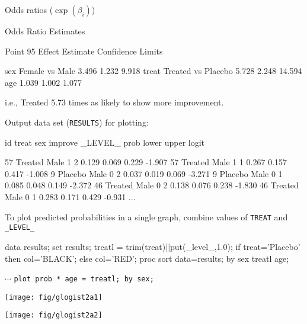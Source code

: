 \begin{frame}[fragile]
Odds ratios ($\exp(\beta_i)$)
\begin{Output}[gobble=5,fontsize=\footnotesize,baselinestretch=0.9]
                              Odds Ratio Estimates
                                        
                                         Point          95%
          Effect                      Estimate      Confidence Limits

          sex   Female vs Male           3.496       1.232       9.918
          treat Treated vs Placebo       5.728       2.248      14.594
          age                            1.039       1.002       1.077
\end{Output}
i.e., Treated 5.73 times as likely to show more improvement.
\vspace{1.5ex}

Output data set (\texttt{RESULTS}) for plotting:
\begin{Output}[gobble=2,fontsize=\footnotesize,baselinestretch=0.9]
  id    treat    sex  improve  _LEVEL_   prob   lower   upper   logit

  57   Treated   Male     1       2      0.129   0.069   0.229  -1.907
  57   Treated   Male     1       1      0.267   0.157   0.417  -1.008
   9   Placebo   Male     0       2      0.037   0.019   0.069  -3.271
   9   Placebo   Male     0       1      0.085   0.048   0.149  -2.372
  46   Treated   Male     0       2      0.138   0.076   0.238  -1.830
  46   Treated   Male     0       1      0.283   0.171   0.429  -0.931
  ...
\end{Output}
\end{frame}

\begin{frame}[fragile]
To plot predicted probabilities in a single graph, combine values of \texttt{TREAT} and
\verb|_LEVEL_|
\begin{Input}[fontsize=\small,label=\fbox{$\cdots$ \texttt{glogist2a.sas} $\cdots$},baselinestretch=0.8,firstnumber=13]
data results;
   set results;
   treatl = trim(treat)||put(_level_,1.0); 
   if treat='Placebo' then col='BLACK';
                      else col='RED';
proc sort data=results;
   by sex treatl age;
\end{Input}
$\cdots$ \texttt{plot prob * age = treatl; by sex;}
\begin{center}
 \begin{minipage}[b]{.35\linewidth}
  \centering
  \texttt{[image: fig/glogist2a1]}
 \end{minipage}%
 \begin{minipage}[b]{.35\linewidth}
  \centering
  \texttt{[image: fig/glogist2a2]}
 \end{minipage}
\end{center}
\end{frame}

